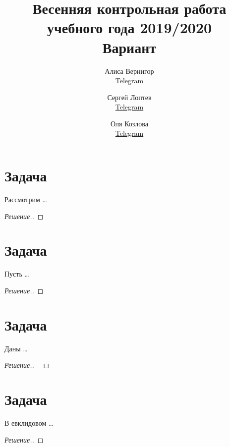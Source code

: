 \documentclass[a4paper]{article}
\title{Весенняя контрольная работа учебного года 2019/2020\\Вариант \textnumero 1}
\author{	
  Алиса Вернигор       \\ \href{https://t.me/allisyonok}{Telegram} \and
	Сергей Лоптев        \\ \href{https://t.me/beast_sl}{Telegram} \and
	Оля Козлова        \\ \href{https://t.me/grenlayk}{Telegram}
}
\date{}
\theoremstyle{remark}
\begin{document}
	\maketitle
    \section*{Задача }
        Рассмотрим \dots
        \begin{proof}[Решение.]
                
        \end{proof}	 
    
    \section*{Задача }
        Пусть \dots
        \begin{proof}[Решение.]

        \end{proof}
    
    \section*{Задача }
        Даны \dots
        \begin{proof}[Решение.] \ 
            
        \end{proof}
      
    \section*{Задача }
        В евклидовом \dots
        \begin{proof}[Решение.]
            
        \end{proof}
    
\end{document}
